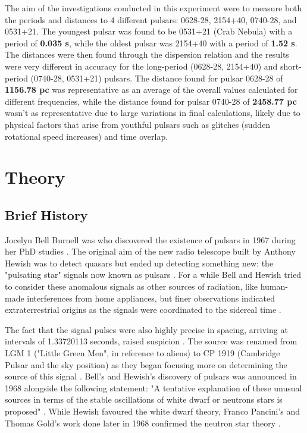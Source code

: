 \documentclass[12pt]{article}
\begin{document}
The aim of the investigations conducted in this experiment were to measure both the periods and distances to 4 different pulsars: 0628-28, 2154+40, 0740-28, and 0531+21. The youngest pulsar was found to be 0531+21 (Crab Nebula) with a period of \textbf{0.035 s}, while the oldest pulsar
was 2154+40 with a period of \textbf{1.52 s}. The distances were then found through the dispersion relation and the results were very different in accuracy for the long-period (0628-28, 2154+40) and short-period (0740-28, 0531+21) pulsars.
The distance found for pulsar 0628-28 of \textbf{1156.78 pc} was representative as an average of the overall values calculated for different frequencies, while the distance found for pulsar 0740-28 of \textbf{2458.77 pc} wasn't as representative due to large variations in final calculations, likely
due to physical factors that arise from youthful pulsars such as glitches (sudden rotational speed increases) and time overlap.

\newpage

\tableofcontents
\thispagestyle{empty}

\newpage


\setcounter{page}{1}
\section{Theory} \label{sec:1}

\subsection{Brief History}

Jocelyn Bell Burnell was who discovered the existence of pulsars in 1967 during her PhD studies \cite{jocelyn1,UCDpulsars,jones1968bell}.
The original aim of the new radio telescope built by Anthony Hewish was to detect quasars but ended up detecting something new: the "pulsating star" signals now known as pulsars \cite{jones1968bell,jocelyn1}.
For a while Bell and Hewish tried to consider these anomalous signals as other sources of radiation, like human-made interferences from home appliances, but finer observations indicated extraterrestrial origins as the signals were 
coordinated to the sidereal time \cite{UCDpulsars,jones1968bell}.

The fact that the signal pulses were also highly precise in spacing, arriving at intervals of 1.33720113 seconds, raised suspicion \cite{UCDpulsars,jones1968bell}.
The source was renamed from LGM 1 ("Little Green Men", in reference to aliens) to CP 1919 (Cambridge Pulsar and the sky position) as they began focusing more on determining the source of this signal \cite{jones1968bell}.
Bell's and Hewish's discovery of pulsars was announced in 1968 alongside the following statement: "A tentative explanation of these unusual sources in terms of the stable oscillations of white dwarf or neutrons stars is proposed" \cite{jones1968bell}.
While Hewish favoured the white dwarf theory, Franco Pancini's and Thomas Gold's work done later in 1968 confirmed the neutron star theory \cite{jones1968bell}.
\end{document}
